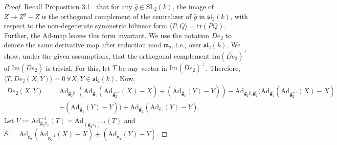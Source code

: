 \documentclass[10pt,twoside]{amsart}
\newcommand{\SL}{\mathrm{SL}}
\newcommand{\tr}{\mathrm{tr}}
\newcommand{\im}{\mathrm{Im}}
\theoremstyle{definition}
\theoremstyle{definition}
\begin{document}
\begin{proof}
Recall Proposition 3.1~\cite{AvniGelanderKassabovShalev} that for any $\bar g\in \SL_2(k)$, the image of $Z\mapsto Z^{\bar g}-Z$ is the orthogonal complement of the centralizer of $\bar g$ in $\mathfrak{sl}_2(k)$, with respect to the non-degenerate symmetric bilinear form $\langle P, Q\rangle = \tr(PQ)$. Further, the $\mathrm{Ad}$-map leaves this form invariant. We use the notation $\overline{De_2}$ to denote the same derivative map after reduction mod $\mathfrak{m}_2$, i.e., over $\mathfrak{sl}_2(k)$. We show, under the given assumptions, that the orthogonal complement $\im(\overline{De}_2)^{\perp}$ of $\im(\overline{De}_2)$ is trivial. For this, let $T$ be any vector in $\im(\overline{De}_2)^{\perp}$. Therefore, $\langle T, \overline{De}_2(X, Y)\rangle = 0 \ \forall X, Y\in \mathfrak{sl}_2(k)$. Now,
\begin{eqnarray*}
\overline{D}e_2(X,Y)&=& \mathrm{Ad}_{\mathbf{\bar g}_2 \bar e_1}\left(\mathrm{Ad}_{\mathbf{\bar g}_1}(\mathrm{Ad}_{\mathbf{\bar g}_2^{-1}}(X)-X)+(\mathrm{Ad}_{\mathbf{\bar g}_1}(Y)-Y)\right)-\mathrm{Ad}_{\mathbf{\bar g}_2 \bar e_1\mathbf{\bar g}_2}\Big(\mathrm{Ad}_{\mathbf{\bar g}_1}(\mathrm{Ad}_{\mathbf{\bar g}_2^{-1}}(X)-X) \\ && +(\mathrm{Ad}_{\mathbf{\bar g}_1}(Y)-Y)\Big) + \mathrm{Ad}_{\mathbf{\bar g}_2}(\mathrm{Ad}_{ \bar e_1}(Y)-Y).
\end{eqnarray*}
\noindent Let $V := \mathrm{Ad}_{\mathbf{\bar g}_2\bar e_1}^{-1}(T) = \mathrm{Ad}_{(\mathbf{\bar g}_2\bar e_1)^{-1}}(T)$ and $S := \mathrm{Ad}_{\mathbf{\bar g}_1}(\mathrm{Ad}_{\mathbf{\bar g}_2^{-1}}(X) - X)+(\mathrm{Ad}_{\mathbf{\bar g}_1}(Y)-Y)$. 


\end{proof}
\end{document}

